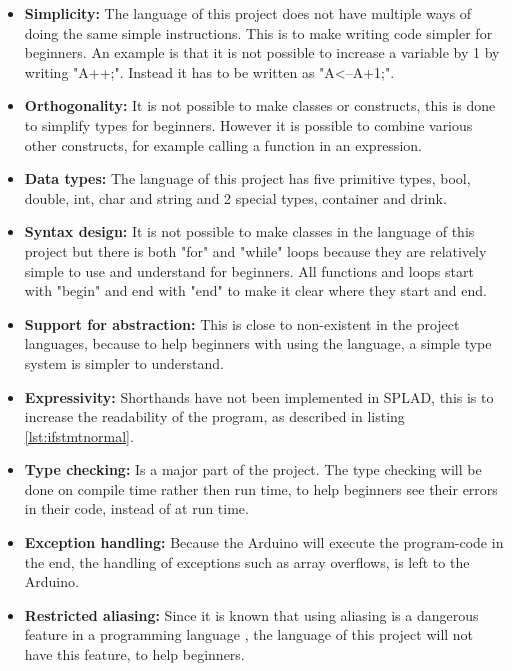 \begin{itemize}
\item \textbf{Simplicity:} The language of this project does not have multiple ways of doing the same simple instructions. This is to make writing code simpler for beginners. An example is that it is not possible to increase a variable by 1 by writing "A++;". Instead it has to be written as "A<--A+1;".

\item \textbf{Orthogonality:} It is not possible to make classes or constructs, this is done to simplify types for beginners. However it is possible to combine various other constructs, for example calling a function in an expression. 

\item \textbf{Data types:} The language of this project has five primitive types, bool, double, int, char and string and 2 special types, container and drink. 

\item \textbf{Syntax design:} It is not possible to make classes in the language of this project but there is both "for" and "while" loops because they are relatively simple to use and understand for beginners. All functions and loops start with "begin" and end with "end" to make it clear where they start and end.

\item \textbf{Support for abstraction:} This is close to non-existent in the project languages, because to help beginners with using the language, a simple  type system is simpler to understand.

\item \textbf{Expressivity:} Shorthands have not been implemented in SPLAD, this is to increase the readability of the program, as described in listing \ref{lst:ifstmtnormal}.

\item \textbf{Type checking:} Is a major part of the project. The type checking will be done on compile time rather then run time, to help beginners see their errors in their code, instead of at run time.

\item \textbf{Exception handling:} Because the Arduino will execute the program-code in the end, the handling of exceptions such as array overflows, is left to the Arduino.

\item \textbf{Restricted aliasing:} Since it is known that using aliasing is a dangerous feature in a programming language  \citep{sebesta}, the language of this project will not have this feature, to help beginners.
\end{itemize}
